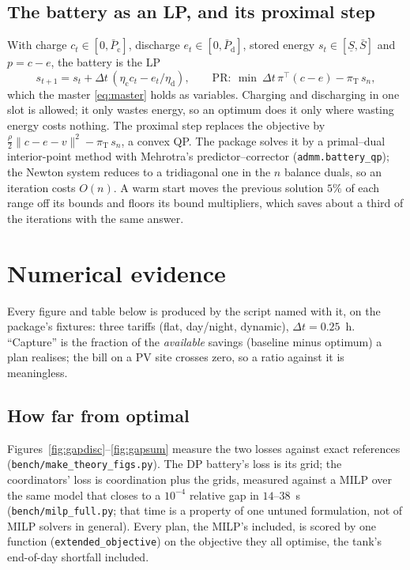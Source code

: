 \documentclass[11pt,a4paper]{article}
\newcommand{\Ec}{\eta_{\mathrm c}}
\newcommand{\Ed}{\eta_{\mathrm d}}
\newcommand{\dt}{\Delta t}
\newcommand{\PR}{\mathrm{PR}}
\begin{document}
\subsection{The battery as an LP, and its proximal step}
\label{app:lp}

With charge $c_t \in [0, \bar P_{\mathrm c}]$, discharge $e_t \in [0, \bar
P_{\mathrm d}]$, stored energy $s_t \in [\underline S, \bar S]$ and $p = c - e$,
the battery is the LP
\begin{equation}
  s_{t+1} = s_t + \dt\,(\Ec c_t - e_t/\Ed), \qquad
  \PR:\ \min\ \dt\,\pi^{\!\top}(c - e) - \pi_{\mathrm T}\,s_n ,
  \label{eq:batterylp}
\end{equation}
which the master \eqref{eq:master} holds as variables. Charging and discharging
in one slot is allowed; it only wastes energy, so an optimum does it only where
wasting energy costs nothing. The proximal step replaces the objective by
$\tfrac{\rho}{2}\|c - e - v\|^2 - \pi_{\mathrm T}\,s_n$, a convex QP. The package
solves it by a primal--dual interior-point method with Mehrotra's
predictor--corrector (\texttt{admm.battery\_qp}); the Newton system
reduces to a tridiagonal one in the $n$ balance duals, so an iteration costs
$O(n)$. A warm start moves the previous solution $5\%$ of each range off its
bounds and floors its bound multipliers, which saves about a third of the
iterations with the same answer.

\section{Numerical evidence}
\label{app:evidence}

Every figure and table below is produced by the script named with it, on the
package's fixtures: three tariffs (flat, day/night, dynamic), $\dt = 0.25$~h.
``Capture'' is the fraction of the \emph{available} savings (baseline minus
optimum) a plan realises; the bill on a PV site crosses zero, so a ratio against
it is meaningless.

\subsection{How far from optimal}
\label{app:gaps}

Figures~\ref{fig:gapdisc}--\ref{fig:gapsum} measure the two losses against exact
references (\texttt{bench/make\_theory\_figs.py}). The DP battery's loss is its
grid; the coordinators' loss is coordination plus the grids, measured against a
MILP over the same model that closes to a $10^{-4}$ relative gap in $14$--$38$~s
(\texttt{bench/milp\_full.py}; that time is a property of one untuned
formulation, not of MILP solvers in general). Every plan, the MILP's included, is
scored by one function (\texttt{extended\_objective}) on the objective they all
optimise, the tank's end-of-day shortfall included.
\end{document}
